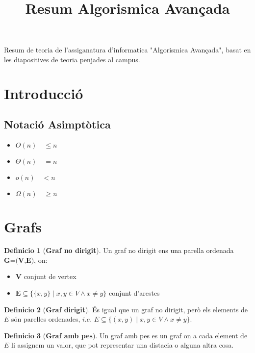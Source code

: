 \documentclass[12pt]{article}
\title{Resum Algorismica Avançada}
\theoremstyle{definition}
\newtheorem{definicio}{Definicio}
\theoremstyle{definition}
\theoremstyle{definition}
\theoremstyle{definition}
\theoremstyle{definition}
\theoremstyle{definition}
\theoremstyle{definition}
\begin{document}
\maketitle

\tableofcontents

\newpage

Resum de teoria de l'assiganatura d'informatica "Algorismica Avançada", basat en les diapositives de teoria penjades al campus.

\section{Introducció}

\subsection{Notació Asimptòtica}

\begin{itemize}
	\item $O(n)\quad \leq n$
	\item $\Theta (n) \quad =n$
	\item $o(n)\quad <n$
	\item $\Omega(n)\quad \geq n$
\end{itemize}

\section{Grafs}

\begin{definicio}[\textbf{Graf no dirigit}]
Un graf no dirigit ens una parella ordenada $\textbf{G=(V,E)}$, on:
\begin{itemize}
	\item $\textbf{V}$ conjunt de vertex
	\item $\textbf{E}\subseteq \{\{x,y\}\mid x,y\in V \wedge x\neq y\}$ conjunt d'arestes
\end{itemize}
\end{definicio}

\begin{definicio}[\textbf{Graf dirigit}]
És igual que un graf no dirigit, però els elements de $E$ són parelles ordenades, $i.e.$ $E\subseteq \{(x,y)\mid x,y\in V \wedge x\neq y\}$.
\end{definicio}

\begin{definicio}[\textbf{Graf amb pes}]
Un graf amb pes es un graf on a cada element de $E$ li assignem un valor, que pot representar una distacia o alguna altra cosa.
\end{definicio}
\end{document}
